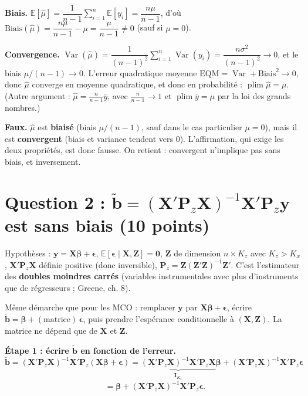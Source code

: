 \documentclass[11pt,a4paper]{article}
\newcommand{\vy}{\mathbf{y}}\newcommand{\vX}{\mathbf{X}}\newcommand{\vZ}{\mathbf{Z}}
\newcommand{\vbeta}{\bm{\beta}}\newcommand{\veps}{\bm{\epsilon}}\newcommand{\vi}{\bm{\iota}}
\newcommand{\I}{\mathbf{I}}\newcommand{\Pm}{\mathbf{P}}\newcommand{\Mm}{\mathbf{M}}
\newcommand{\tb}{\tilde{\mathbf{b}}}
\newcommand{\E}{\mathbb{E}}\newcommand{\Var}{\operatorname{Var}}\newcommand{\Cov}{\operatorname{Cov}}
\newcommand{\plim}{\operatorname{plim}}
\newcommand{\sumi}{\sum_{i=1}^{n}}
\begin{document}
\textbf{Biais.} $\E[\hat\mu]=\dfrac1{n-1}\sumi\E[y_i]=\dfrac{n\mu}{n-1}$, d'où $\text{Biais}(\hat\mu)=\dfrac{n\mu}{n-1}-\mu=\dfrac{\mu}{n-1}\neq0$ (sauf si $\mu=0$).

\textbf{Convergence.} $\Var(\hat\mu)=\dfrac{1}{(n-1)^2}\sumi\Var(y_i)=\dfrac{n\sigma^2}{(n-1)^2}\to0$, et le biais $\mu/(n-1)\to0$. L'erreur quadratique moyenne $\text{EQM}=\Var+\text{Biais}^2\to0$, donc $\hat\mu$ converge en moyenne quadratique, et donc en probabilité : $\plim\hat\mu=\mu$. (Autre argument : $\hat\mu=\frac{n}{n-1}\bar y$, avec $\frac{n}{n-1}\to1$ et $\plim\bar y=\mu$ par la loi des grands nombres.)

\begin{reponse}
\textbf{Faux.} $\hat\mu$ est \textbf{biaisé} (biais $\mu/(n-1)$, sauf dans le cas particulier $\mu=0$), mais il est \textbf{convergent} (biais et variance tendent vers 0). L'affirmation, qui exige les deux propriétés, est donc fausse. On retient : convergent n'implique pas sans biais, et inversement.
\end{reponse}

\section{Question 2 : $\tb=(\vX'\Pm_z\vX)^{-1}\vX'\Pm_z\vy$ est sans biais (10 points)}

Hypothèses : $\vy=\vX\vbeta+\veps$, $\E[\veps\mid\vX,\vZ]=\mathbf 0$, $\vZ$ de dimension $n\times K_z$ avec $K_z>K_x$, $\vX'\Pm_z\vX$ définie positive (donc inversible), $\Pm_z=\vZ(\vZ'\vZ)^{-1}\vZ'$. C'est l'estimateur des \textbf{doubles moindres carrés} (variables instrumentales avec plus d'instruments que de régresseurs ; Greene, ch. 8).

\begin{idee}
Même démarche que pour les MCO : remplacer $\vy$ par $\vX\vbeta+\veps$, écrire $\tb=\vbeta+(\text{matrice})\,\veps$, puis prendre l'espérance conditionnelle à $(\vX,\vZ)$. La matrice ne dépend que de $\vX$ et $\vZ$.
\end{idee}

\textbf{Étape 1 : écrire $\tb$ en fonction de l'erreur.}
\[
\tb=(\vX'\Pm_z\vX)^{-1}\vX'\Pm_z(\vX\vbeta+\veps)
=\underbrace{(\vX'\Pm_z\vX)^{-1}\vX'\Pm_z\vX}_{\I_{K_x}}\vbeta+(\vX'\Pm_z\vX)^{-1}\vX'\Pm_z\veps
\]
\[
\phantom{\tb}=\vbeta+(\vX'\Pm_z\vX)^{-1}\vX'\Pm_z\veps .
\]
\end{document}

